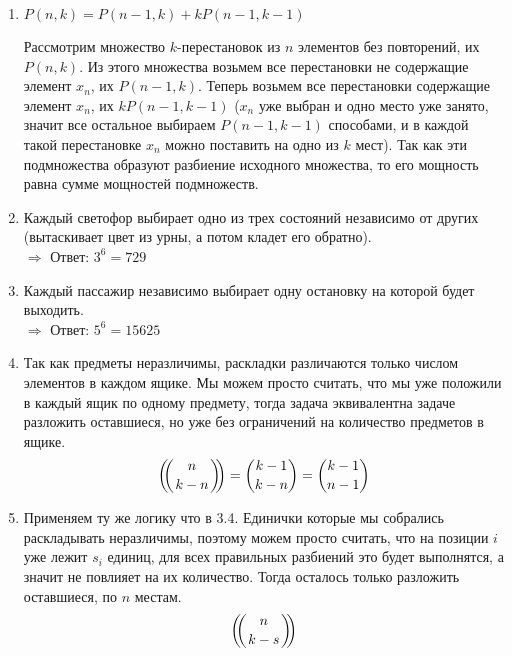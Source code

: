 \documentclass[10pt]{article}
\newcommand{\rchoose}[2]{\left(\mkern-6mu \left({#1 \atop #2}\right) \mkern-6mu \right)}
\begin{document}
\begin{enumerate}[label*=3.\arabic*]
	\item $P(n, k) = P(n-1, k) + kP(n-1, k-1)$
	
	Рассмотрим множество $k$-перестановок из $n$ элементов без повторений, их $P(n, k)$. Из этого множества возьмем все перестановки не содержащие элемент $x_n$, их $P(n-1, k)$. Теперь возьмем все перестановки содержащие элемент $x_n$, их $kP(n-1, k-1)$ ($x_n$ уже выбран и одно место уже занято, значит все остальное выбираем $P(n-1, k-1)$ способами, и в каждой такой перестановке $x_n$ можно поставить на одно из $k$ мест). Так как эти подмножества образуют разбиение исходного множества, то его мощность равна сумме мощностей подмножеств.
	
	\item Каждый светофор выбирает одно из трех состояний независимо от других (вытаскивает цвет из урны, а потом кладет его обратно).\\
	$\Rightarrow$ Ответ: $3^6=729$
	
	\item Каждый пассажир независимо выбирает одну остановку на которой будет выходить.\\
	$\Rightarrow$ Ответ: $5^6=15625$
	
	\item Так как предметы неразличимы, раскладки различаются только числом элементов в каждом ящике. Мы можем просто считать, что мы уже положили в каждый ящик по одному предмету, тогда задача эквивалентна задаче разложить оставшиеся, но уже без ограничений на количество предметов в ящике.
	$$\rchoose{n}{k-n} = \binom{k-1}{k-n} = \binom{k-1}{n-1}$$

	\item Применяем ту же логику что в 3.4. Единички которые мы собрались раскладывать неразличимы, поэтому можем просто считать, что на позиции $i$ уже лежит $s_i$ единиц, для всех правильных разбиений это будет выполнятся, а значит не повлияет на их количество. Тогда осталось только разложить оставшиеся, по $n$ местам.
	$$\rchoose{n}{k-s}$$
	
\end{enumerate}
\end{document}
